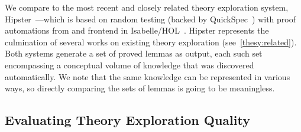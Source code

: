\begin{comment} 
The better known but opposed approach is the common SMT solver approach (Barrett et al., Gil et al.). In the SMT approach, the solver attempts to search for a legal valuation, and assumptions are made freely. This leads to a cheap splitting mechanism, but with an expensive backtracking algorithm. We evaluated our case splitting mechanism by applying TheSy to Clam’s (Claessen et al.) theory-proving dataset with three configurations: no case splitting - default implementation; half case splitting – splitting was applied only during proof search; and full  case splitting – splitting was applied for both exploration and proof search. Each test case was limited to 15 minutes and 16 GB RAM, and the results are shown in Table 1. Additionally, we report the number of lemmas found in the full configuration compared to the half configuration and the number of proofs filtered in each configuration. An interesting point is that the no and full configurations had 53 and 54 goals proved, respectively. This difference is due to full configuration time-outing during case splitting in which regular exploration is sufficient. Using the half configuration, TheSy proved 61 goals which mostly overlap with the previous configurations as it is less prune to time-outs. In total, TheSy proved 63 out of the 85 goals. Memory and time limits lead to most of the full case splitting failures. Case splitting during exploration led to additional conjectures and lemmas; many conjectures were filtered only after proving their correctness, a phenomenon which impaired the conjecture generation/screening process. This happened because TheSy’s e-graph size is limited for memory concerns, resulting in an unsound screening process .
\end{comment}

We compare \TheSy to the most recent and closely related theory exploration system, Hipster~\cite{hipster}---which is
based on random testing (backed by QuickSpec~\cite{JFP2017:Smallbone}) with proof automations from and frontend in Isabelle/HOL~\cite{Book2002:Nipkow}.
Hipster represents the culmination of several works on existing theory exploration (see~\autoref{thesy:related}).
Both systems generate a set of proved lemmas as output, each such set encompassing a conceptual volume of knowledge that was discovered automatically.
We note that the same knowledge can be represented in various ways, so directly comparing the sets of lemmas is going to be meaningless.

\subsection{Evaluating Theory Exploration Quality}

